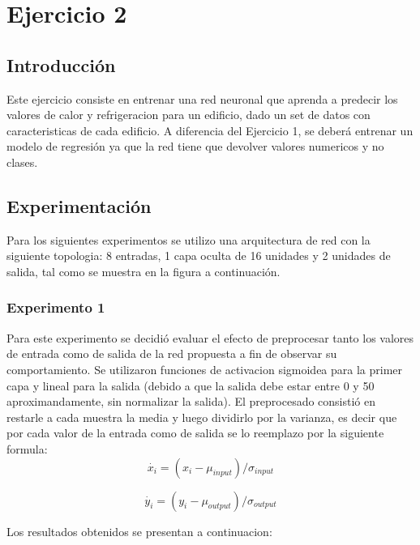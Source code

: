\section{Ejercicio 2}

\subsection{Introducción}
Este ejercicio consiste en entrenar una red neuronal que aprenda a predecir los valores de calor y refrigeracion para un edificio, dado un set de datos
con caracteristicas de cada edificio. A diferencia del Ejercicio 1, se deberá entrenar un modelo de regresión ya que la red tiene que devolver valores
numericos y no clases.

\subsection{Experimentación}
Para los siguientes experimentos se utilizo una arquitectura de red con la siguiente topologia: 8 entradas, 1 capa oculta de 16 unidades y 2 unidades de salida,
tal como se muestra en la figura a continuación.

\subsubsection{Experimento 1}
Para este experimento se decidió evaluar el efecto de preprocesar tanto los valores de entrada como de salida de la red propuesta a fin de observar su
comportamiento. Se utilizaron funciones de activacion sigmoidea para la primer capa y lineal para la salida (debido a que la salida debe estar entre 0 y 50 aproximandamente,
 sin normalizar la salida). El preprocesado consistió en restarle a cada muestra la media y luego dividirlo por la varianza, es decir que por cada valor de la entrada
como de salida se lo reemplazo por la siguiente formula:
\begin{equation}
  \dot{x_{i}} = (x_{i} - \mu_{input}) / \sigma_{input}
\end{equation}

\begin{equation}
  \dot{y_{i}} = (y_{i} - \mu_{output}) / \sigma_{output}
\end{equation}

Los resultados obtenidos se presentan a continuacion:

